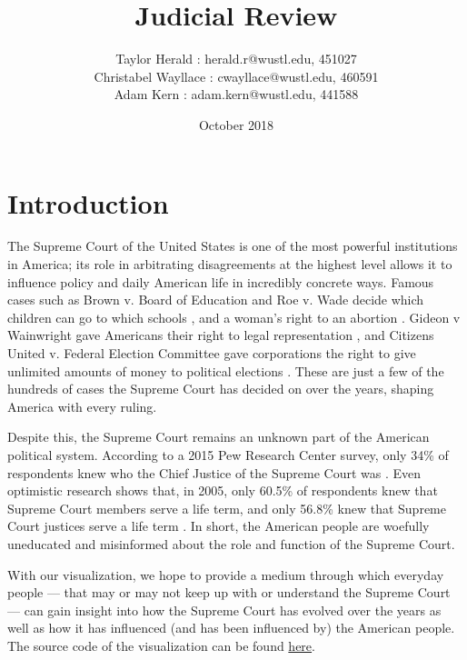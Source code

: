 \documentclass{article}
\title{Judicial Review}
\author{ Taylor Herald : herald.r@wustl.edu, 451027\\
            Christabel Wayllace : cwayllace@wustl.edu, 460591\\
            Adam Kern : adam.kern@wustl.edu, 441588
}
\date{October 2018}
\begin{document}
\maketitle

\section{Introduction}
The Supreme Court of the United States is one of the most powerful institutions in America; its role in arbitrating disagreements at the highest level allows it to influence policy and daily American life in incredibly concrete ways.  Famous cases such as Brown v. Board of Education and Roe v. Wade decide which children can go to which schools \cite{oyez-brown}, and a woman's right to an abortion \cite{oyez-roe}.  Gideon v Wainwright gave Americans their right to legal representation \cite{oyez-gideon}, and Citizens United v. Federal Election Committee gave corporations the right to give unlimited amounts of money to political elections \cite{oyez-fec}.  These are just a few of the hundreds of cases the Supreme Court has decided on over the years, shaping America with every ruling.

Despite this, the Supreme Court remains an unknown part of the American political system.  According to a 2015 Pew Research Center survey, only 34\% of respondents knew who the Chief Justice of the Supreme Court was \cite{pew-scotus-awareness}.  Even optimistic research shows that, in 2005, only 60.5\% of respondents knew that Supreme Court members serve a life term, and only 56.8\% knew that Supreme Court justices serve a life term \cite{gibson-survey}.  In short, the American people are woefully uneducated and misinformed about the role and function of the Supreme Court.

With our visualization, we hope to provide a medium through which everyday people --- that may or may not keep up with or understand the Supreme Court --- can gain insight into how the Supreme Court has evolved over the years as well as how it has influenced (and has been influenced by) the American people. The source code of the visualization can be found \href{https://github.com/therald/Judicial-Review.git}{here}.
\end{document}
